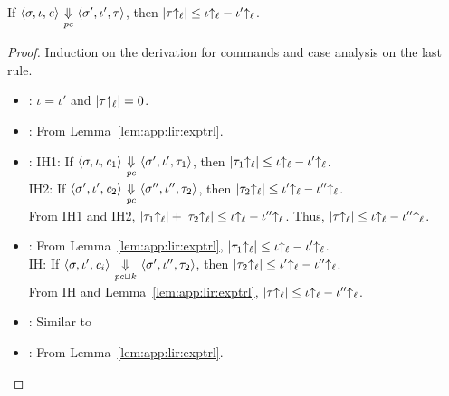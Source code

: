 \begin{myThm}[LIR]
\label{thm:app:lir:cmdtrl}
If $\langle \sigma, \iota, \mathit{c} \rangle {~\underset{\mathit{pc}}{\Downarrow}~} \langle
  \sigma', \iota', \tau \rangle$, then 
$|\tau{\uparrow_\ell}| \leq \iota{\uparrow_\ell} - \iota'{\uparrow_\ell}$. 
\end{myThm}
\begin{proof}
  Induction on the derivation for commands and case analysis on the
  last rule.  
  \begin{itemize}[leftmargin=.5in]
    \item{}: $\iota = \iota'$ and $|\tau{\uparrow_\ell}| = 0$. 
    \item{}: From Lemma~\ref{lem:app:lir:exptrl}.
    \item{}: IH1: If $\langle \sigma, \iota, \mathit{c}_1 \rangle
      {~\underset{\mathit{pc}}{\Downarrow}~} \langle \sigma', \iota', \tau_1 \rangle$, then 
      $|\tau_1{\uparrow_\ell}| \leq \iota{\uparrow_\ell} - \iota'{\uparrow_\ell}$. \\
      IH2: If $\langle \sigma', \iota', \mathit{c}_2 \rangle
      {~\underset{\mathit{pc}}{\Downarrow}~} \langle \sigma'', \iota'', \tau_2 \rangle$, then 
      $|\tau_2{\uparrow_\ell}| \leq \iota'{\uparrow_\ell} - \iota''{\uparrow_\ell}$. \\
      From IH1 and IH2, $|\tau_1{\uparrow_\ell}| + |\tau_2{\uparrow_\ell}| \leq
      \iota{\uparrow_\ell} - \iota''{\uparrow_\ell}$. Thus, $|\tau{\uparrow_\ell}| \leq \iota{\uparrow_\ell}
      - \iota''{\uparrow_\ell}$. 
    \item{}: From Lemma~\ref{lem:app:lir:exptrl}, $|\tau_1{\uparrow_\ell}| \leq
      \iota{\uparrow_\ell} - \iota'{\uparrow_\ell}$. \\
      IH: If $\langle \sigma, \iota', \mathit{c}_i \rangle
      {~\underset{\mathit{pc}\sqcup k}{\Downarrow}~} \langle \sigma', \iota'', \tau_2 \rangle$, then 
      $|\tau_2{\uparrow_\ell}| \leq \iota'{\uparrow_\ell} - \iota''{\uparrow_\ell}$. \\
      From IH and Lemma~\ref{lem:app:lir:exptrl}, $|\tau{\uparrow_\ell}| \leq
      \iota{\uparrow_\ell} - \iota''{\uparrow_\ell}$. 
    \item{}: Similar to 
    \item{}: From Lemma~\ref{lem:app:lir:exptrl}.
  \end{itemize}
\end{proof}


